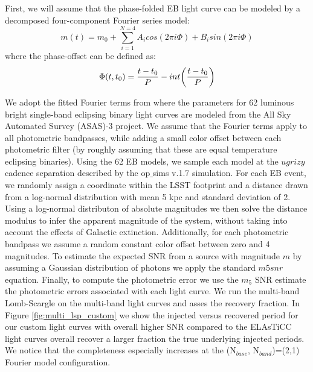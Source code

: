 \documentclass[DM,authoryear,toc]{lsstdoc}
\begin{document}
First, we will assume that the phase-folded EB light curve can be modeled by a decomposed four-component Fourier series model:
\begin{equation}
m(t) = m_0 + \sum_{i=1}^{N=4} A_icos(2\pi i\Phi) + B_isin(2\pi i \Phi)
\end{equation}
where the phase-offset can be defined as:
\begin{equation}
\Phi(t,t_{0}) = \frac{t-t_{0}}{P}-int\bigg{(}\frac{t-t_{0}}{P} \bigg{)}
\end{equation}

We adopt the fitted Fourier terms from \citet{Deb:Deb11} where the parameters for 62 luminous bright single-band eclipsing binary light curves are modeled from the All Sky Automated Survey
(ASAS)-3 project.
We assume that the Fourier terms apply to all photometric bandpasses, while adding a small color offset between each photometric filter (by roughly assuming that these are equal temperature eclipsing binaries).
Using the 62 EB models, we sample each model at the $ugrizy$ cadence separation described by the op$\_$sims v.1.7 simulation.
For each EB event, we randomly assign a coordinate within the LSST footprint and a distance drawn from a log-normal distribution with mean 5 kpc and standard deviation of 2.
Using a log-normal distributon of absolute magnitudes we then solve the distance modulus to infer the apparent magnitude of the system, without taking into account the effects of Galactic extinction.
Additionally, for each photometric bandpass we assume a random constant color offset between zero and 4 magnitudes.
To estimate the expected SNR from a source with magnitude $m$ by assuming a Gaussian distribution of photons we apply the standard $m5snr$ equation.
Finally, to compute the photometric error we use the $m_5$ SNR estimate the photometric errors associated with each light curve.
We run the multi-band Lomb-Scargle on the multi-band light curves and asses the recovery fraction.
In Figure \ref{fig:multi_lsp_custom} we show the injected versus recovered period for our custom light curves with overall higher SNR compared to the 
ELAsTiCC light curves overall recover a larger fraction the true underlying injected periods.
We notice that the completeness especially increases at the (N$_{base}$, N$_{band}$)=(2,1) Fourier model configuration.
\end{document}
